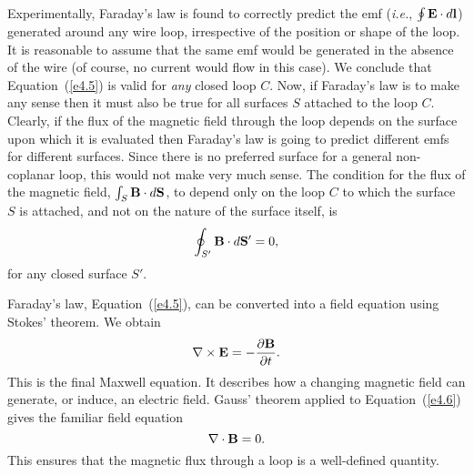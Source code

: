 Experimentally, Faraday's law is found to correctly predict the emf
({\em i.e.}, $\oint {\bf E}\cdot d{\bf l}$) generated around any wire loop, irrespective of
the position or shape of the loop.
 It is reasonable to assume that the same emf would be
generated in the absence of the wire (of course, no current would flow
in this case). We conclude that Equation~(\ref{e4.5}) is valid for {\em any}\/ closed loop $C$. Now, if Faraday's
law is to make any sense then it must also be true for all surfaces $S$ attached to the
loop $C$. Clearly, if the flux of the magnetic field through the loop depends on
the surface upon which it is evaluated then Faraday's law is going to predict
different emfs for different surfaces. Since there is no preferred surface for
a general non-coplanar loop, this would not make very much sense. The condition
for the flux of the magnetic field, $\int_S {\bf B} \cdot d{\bf S}$, to depend
only on the loop $C$ to which the surface $S$ is attached, and not on the nature
of the surface  itself, is
\begin{equation}\label{e4.6}
\oint_{S'} {\bf B} \cdot d{\bf S}' = 0,
\end{equation}
for any closed surface $S'$. 

Faraday's law, Equation~(\ref{e4.5}), can be converted into a field equation using
 Stokes' theorem. We obtain
\begin{equation}\label{e4.7}
\nabla\times{\bf E} = - \frac{\partial {\bf B}}{\partial t}.
\end{equation}
This is the final Maxwell equation. It describes how a changing magnetic field
can generate, or induce, an electric field. Gauss' theorem applied to Equation~(\ref{e4.6})
gives the familiar field equation
\begin{equation}
\nabla\cdot{\bf B} = 0.
\end{equation}
This ensures that the magnetic flux through a loop is a well-defined quantity.

